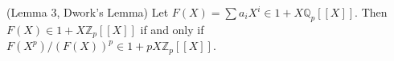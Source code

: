 (Lemma 3, Dwork's Lemma) Let $F(X) = \sum a_i X^i \in 1 + X\mathbb{Q}_p[[X]]$. Then $F(X) \in 1 + X\mathbb{Z}_p[[X]]$ if and only if $F(X^p)/(F(X))^p \in 1 + pX\mathbb{Z}_p[[X]]$.